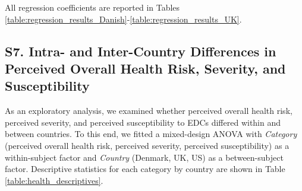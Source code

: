 All regression coefficients are reported in Tables \ref{table:regression_results_Danish}-\ref{table:regression_results_UK}.

\newcommand{\qqplotlabel}[1]{%
    \begin{tikzpicture}[remember picture, overlay]
        \node[anchor=north west, xshift=1.5cm, yshift=-1.2cm, align=left, font=\bfseries]
            at (current page.north west) {Figure \thefigure. Q-Q plot of regression residuals, #1 sample.};
    \end{tikzpicture}%
}







\subsection{S7. Intra- and Inter-Country Differences in Perceived Overall Health Risk, Severity, and Susceptibility}

As an exploratory analysis, we examined whether perceived overall health risk, perceived severity, and perceived susceptibility to EDCs differed within and between countries. To this end, we fitted a mixed-design ANOVA with \textit{Category} (perceived overall health risk, perceived severity, perceived susceptibility) as a within-subject factor and \textit{Country} (Denmark, UK, US) as a between-subject factor. Descriptive statistics for each category by country are shown in Table \ref{table:health_descriptives}.



